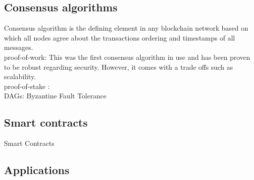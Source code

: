 

\subsection{Consensus algorithms}
Consensus algorithm is the defining element in any blockchain network based on
which all nodes agree about the transactions ordering and timestamps of all
messages.  \\
proof-of-work: This was the first consensus algorithm in use and
has been proven to be robust regarding security. However, it comes with a trade
offs such as scalability. \\

proof-of-stake :  \\

DAGs:  Byzantine Fault Tolerance \\ 



\subsection{Smart contracts}
Smart Contracts 




\subsection{Applications}




